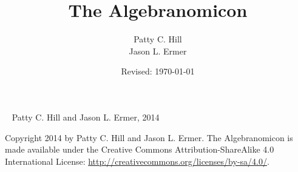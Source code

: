% 
%

\title{The Algebranomicon}
\author{Patty C. Hill \\ Jason L. Ermer}
\date{Revised: \today}

\makeatletter
\let\TITLE\@title
\let\AUTHOR\@author
\let\DATE\@date
\makeatother


\pagestyle{empty}

%  
%

\color{covertextcolor}			%

{\fontsize{32pt}{0pt}\selectfont \textbf{\TITLE}\par}

\makebox[0pt][l]{\rule{1.5\textwidth}{1pt}}

\vfill
{\LARGE \textbf{\AUTHOR}\par}

\clearpage

\restoregeometry		%
\color{black}			%
\ClearWallPaper			%

%  
%
\maketitle

\clearpage

%  
%
\null
\vfill
\noindent
{} ~ Patty C. Hill and Jason L. Ermer, 2014


Copyright {2014} by Patty C. Hill and Jason L. Ermer. The Algebranomicon is made available under the Creative Commons Attribution-ShareAlike 4.0 International License: \url{http://creativecommons.org/licenses/by-sa/4.0/}.

\clearpage
